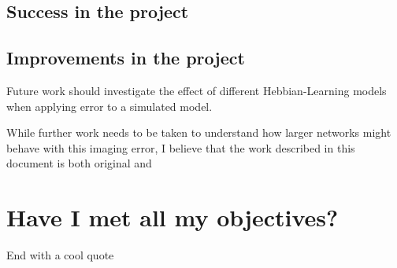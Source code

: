 \subsection{Success in the project}

\subsection{Improvements in the project}

Future work should investigate the effect of different Hebbian-Learning models
when applying error to a simulated model.

While further work needs to be taken to understand how larger networks
might behave with this imaging error, I believe that the work described in this
document is both original and  

\section{Have I met all my objectives?}

End with a cool quote